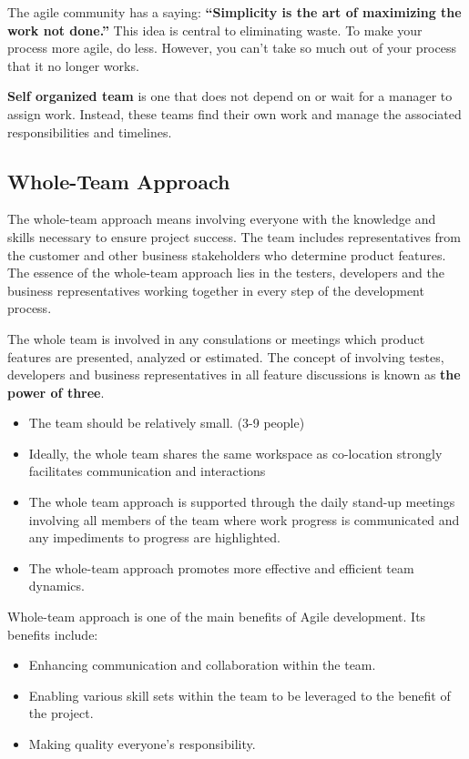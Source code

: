 \documentclass[12pt,a4paper,violet]{bbe}
\begin{document}
	\begin{definition}
        The agile community has a saying: \textbf{“Simplicity is the art of maximizing the work not done.”} This idea is central to eliminating waste. To make your process more agile, do less. However, you can't take so much out of your process that it no longer works.
	\end{definition}
		\begin{definition}
        \textbf{Self organized team} is one that does not depend on or wait for a manager to assign work. Instead, these teams find their own work and manage the associated responsibilities and timelines.
	\end{definition}
	
    \subsection{Whole-Team Approach}
    The whole-team approach means involving everyone with the knowledge and skills necessary to ensure project success. The team includes representatives from the customer and other business stakeholders who determine product features. The essence of the whole-team approach lies in the testers, developers and the business representatives working together in every step of the development process. 
    \begin{remark}
        The whole team is involved in any consulations or meetings which product features are  presented, analyzed or estimated. The concept of involving testes, developers and business representatives in all feature  discussions is known as \textbf{the power of three}.
    \end{remark}
    \begin{itemize}
        \item The team should be relatively small. (3-9 people)
        \item Ideally, the whole team shares the same workspace as co-location strongly facilitates communication and interactions
        \item The whole team approach is supported through the daily stand-up meetings involving all members of the team where work progress is communicated and any impediments to progress are highlighted.
        \item The whole-team approach promotes more effective and efficient team dynamics.
    \end{itemize}
    
    \begin{remark}
        Whole-team approach is one of the main benefits of Agile development. Its benefits include:
        \begin{itemize}
            \item Enhancing communication and collaboration within the team.
            \item Enabling various skill sets within the team to be leveraged to the benefit of the project.
            \item Making quality everyone's responsibility.
        \end{itemize}
    \end{remark}
\end{document}
